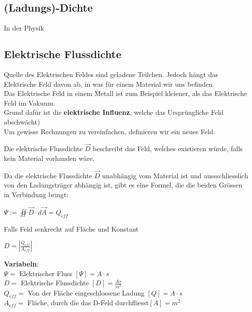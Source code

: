 \subsection{(Ladungs)-Dichte}
In der Physik




\subsection{Elektrische Flussdichte}
Quelle des Elektrischen Feldes sind geladene Teilchen. Jedoch hängt das Elektrische Feld davon ab, in was für einem Material wir uns befinden. \\
Das Elektrische Feld in einem Metall ist zum Beispiel kleiener, als das Elektrische Feld im Vakuum. \\
Grund dafür ist die \textbf{elektrische Influenz}, welche das Ursprüngliche Feld abschwächt) \\
Um gewisse Rechnungen zu vereinfachen, definieren wir ein neues Feld.

\beginip
Die elektrische Flussdichte $\vec{D}$ beschreibt das Feld, welches existieren würde, falls kein Material vorhanden wäre.
\iend

Da die elektrische Flussdichte  $\vec{D}$ unabhängig vom Material ist und aussschliesslich von den Ladungsträger abhängig ist,
gibt es eine Formel, die die beiden Grössen in Verbindung bringt:




\newpage
{}

\begingl
\begin{center}
	\formulaBegin
	$\Psi := \oiint \vec{D}\cdot d\vec{A} = Q_{eff}$
	\formulaEnd

	Falls Feld senkrecht auf Fläche und Konstant \\
	\fspace

	\formulaBegin
	$D = |\frac{Q_{eff}}{A_{eff}}|$
	\formulaEnd

\end{center}
\textbf{Variabeln}: \\
$\Psi = $ Elektrischer Fluss $ [\Psi] = A \cdot s $ \\
$D = $ Elektrische Flussdichte $ [D] = \frac{As}{m^2}$ \\
$ Q_{eff} = $ Von der Fläche eingeschlossene Ladung $[Q] = A\cdot s$ \\
$ A_{eff} = $ Fläche, durch die das D-Feld durchfliesst$ [A] = m^2$ \\

